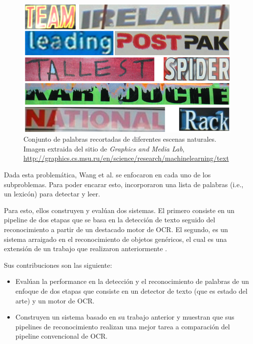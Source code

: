 	\begin{figure}[htbp]
		\centering
		\centerline{ \includegraphics[scale=0.5]{img/cropped_words.png} }
		\caption[Reconocimiento de palabras recortadas]{Conjunto de palabras recortadas de diferentes escenas naturales. Imagen extraida del sitio de \textit{Graphics and Media Lab}, \url{http://graphics.cs.msu.ru/en/science/research/machinelearning/text}}
		\label{fig: Reconocimiento palabras}
	\end{figure}

	Dada esta problemática, Wang et al. se enfocaron en cada uno de los subproblemas. Para poder encarar esto, incorporaron una lista de palabras (i.e., un lexicón) para detectar y leer.
		
	Para esto, ellos construyen y evalúan dos sistemas. El primero consiste en un pipeline de dos etapas que se basa en la detección de texto seguido del reconocimiento a partir de un destacado motor de OCR. El segundo, es un sistema arraigado en el reconocimiento de objetos genéricos, el cual es una extensión de un trabajo que realizaron anteriormente \cite{WB10}.
	
	Sus contribuciones son las siguiente:
		\begin{itemize}
			\item Evalúan la performance en la detección y el reconocimiento de palabras de un enfoque de dos etapas que consiste en un detector de texto (que es estado del arte) y un motor de OCR.
			\item Construyen un sistema basado en su trabajo anterior \cite{WB10} y muestran que sus pipelines de reconocimiento realizan una mejor tarea a comparación del pipeline convencional de OCR.
		\end{itemize}